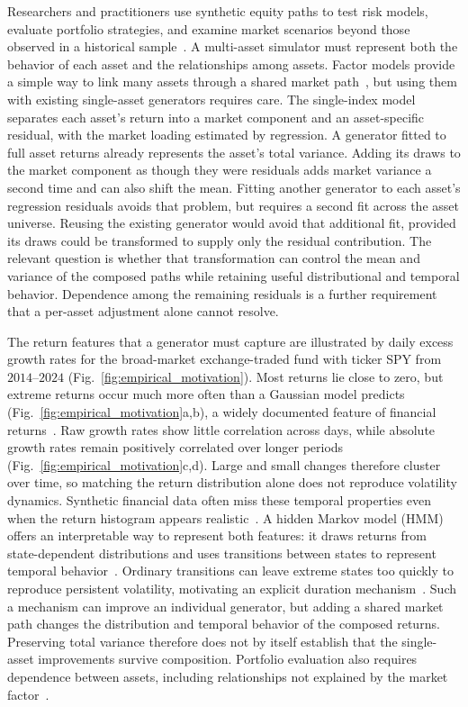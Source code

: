 Researchers and practitioners use synthetic equity paths to test risk
models, evaluate portfolio strategies, and examine market scenarios
beyond those observed in a historical sample~\cite{assefaEtAl2020,
jordonEtAl2022}. A multi-asset simulator must represent both the
behavior of each asset and the relationships among assets. Factor
models provide a simple way to link many assets through a shared
market path~\cite{sharpe1963, rossAPT1976, famaFrench1993}, but using
them with existing single-asset generators requires care. The
single-index model separates each asset's return into a market
component and an asset-specific residual, with the market loading
estimated by regression. A generator fitted to full asset returns
already represents the asset's total variance. Adding its draws to
the market component as though they were residuals adds market
variance a second time and can also shift the mean. Fitting another
generator to each asset's regression residuals avoids that problem,
but requires a second fit across the asset universe. Reusing the
existing generator would avoid that additional fit, provided its
draws could be transformed to supply only the residual contribution.
The relevant question is whether that transformation can control
the mean and variance of the composed paths while retaining useful
distributional and temporal behavior. Dependence among the remaining
residuals is a further requirement that a per-asset adjustment alone
cannot resolve.

The return features that a generator must capture are illustrated by
daily excess growth rates for the broad-market exchange-traded fund
with ticker SPY from $2014$--$2024$
(Fig.~\ref{fig:empirical_motivation}). Most returns lie close to zero,
but extreme returns occur much more often than a Gaussian model
predicts (Fig.~\ref{fig:empirical_motivation}a,b), a widely documented
feature of financial returns~\cite{mandelbrot1963, cont2001}.
Raw growth rates show little correlation across days, while absolute
growth rates remain positively correlated over longer periods
(Fig.~\ref{fig:empirical_motivation}c,d). Large and small changes
therefore cluster over time, so matching the return distribution
alone does not reproduce volatility dynamics. Synthetic financial
data often miss these temporal properties even when the return
histogram appears realistic~\cite{stengerEtAl2024}. A hidden Markov
model (HMM) offers an interpretable way to represent both features:
it draws returns from state-dependent distributions and uses
transitions between states to represent temporal
behavior~\cite{rabinerJuang1986, rydenTerasvirtaAsbrink1998}.
Ordinary transitions can leave extreme states too quickly to
reproduce persistent volatility, motivating an explicit duration
mechanism~\cite{bullaBulla2006}. Such a mechanism can improve an
individual generator, but adding a shared market path changes the
distribution and temporal behavior of the composed returns.
Preserving total variance therefore does not by itself establish
that the single-asset improvements survive composition. Portfolio
evaluation also requires dependence between assets, including
relationships not explained by the market
factor~\cite{embrechtsMcNeilStraumann2002, boucheyNemtchinovWong2015}.

